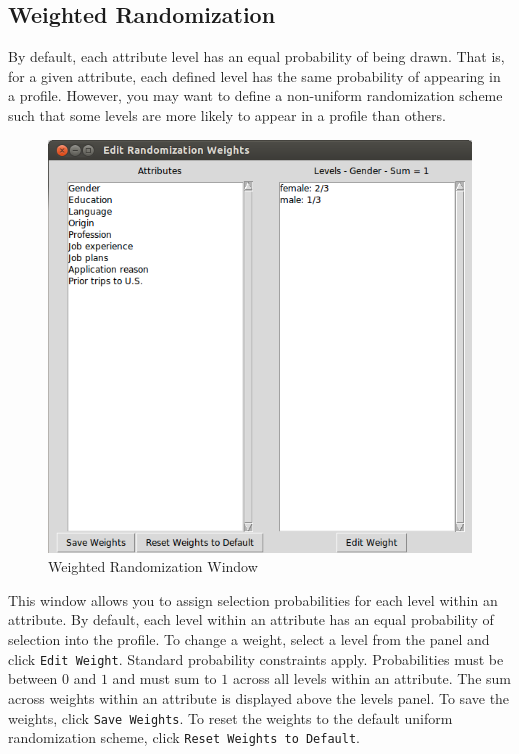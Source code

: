 \documentclass[12pt]{article}
\begin{document}
\subsection{Weighted Randomization}

By default, each attribute level has an equal probability of being drawn. That is, for a given attribute, each defined level has the same probability of appearing in a profile. However, you may want to define a non-uniform randomization scheme such that some levels are more likely to appear in a profile than others. 

\begin{figure}[ht!]
\centering\includegraphics[scale=.6]{graphics/weight_screen.png}
\caption{Weighted Randomization Window}
\end{figure}

This window allows you to assign selection probabilities for each level within an attribute. By default, each level within an attribute has an equal probability of selection into the profile. To change a weight, select a level from the panel and click \texttt{Edit Weight}. Standard probability constraints apply. Probabilities must be between $0$ and $1$ and must sum to $1$ across all levels within an attribute. The sum across weights within an attribute is displayed above the levels panel. To save the weights, click \texttt{Save Weights}. To reset the weights to the default uniform randomization scheme, click \texttt{Reset Weights to Default}.
\end{document}
